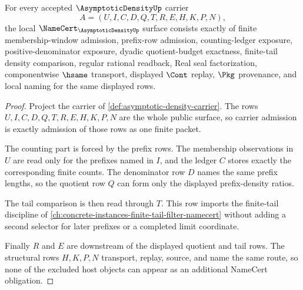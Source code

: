 \begin{theorem}
\label{thm:asymptotic-density-namecert-obligations}
For every accepted $\AsymptoticDensityUp$ carrier
$$
A=(U,I,C,D,Q,T,R,E,H,K,P,N),
$$
the local $\NameCert_{\AsymptoticDensityUp}$ surface consists exactly of finite membership-window admission, prefix-row admission, counting-ledger exposure, positive-denominator exposure, dyadic quotient-budget exactness, finite-tail density comparison, regular rational readback, Real seal factorization, componentwise $\hsame$ transport, displayed $\Cont$ replay, $\Pkg$ provenance, and local naming for the same displayed rows.
\end{theorem}
\begin{proof}
Project the carrier of \autoref{def:asymptotic-density-carrier}. The rows $U,I,C,D,Q,T,R,E,H,K,P,N$ are the whole public surface, so carrier admission is exactly admission of those rows as one finite packet.

The counting part is forced by the prefix rows. The membership observations in $U$ are read only for the prefixes named in $I$, and the ledger $C$ stores exactly the corresponding finite counts. The denominator row $D$ names the same prefix lengths, so the quotient row $Q$ can form only the displayed prefix-density ratios.

The tail comparison is then read through $T$. This row imports the finite-tail discipline of \autoref{ch:concrete-instances-finite-tail-filter-namecert} without adding a second selector for later prefixes or a completed limit coordinate.

Finally $R$ and $E$ are downstream of the displayed quotient and tail rows. The structural rows $H,K,P,N$ transport, replay, source, and name the same route, so none of the excluded host objects can appear as an additional NameCert obligation.
\end{proof}

